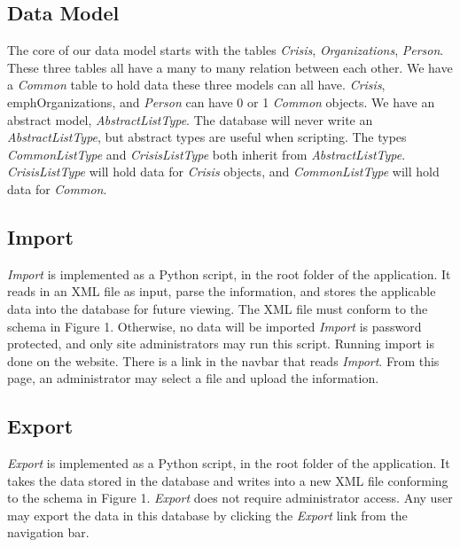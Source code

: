 \documentclass[12pt]{report}
\begin{document}
\subsection*{Data Model}
The core of our data model starts with the tables \emph{Crisis}, \emph{Organizations}, \emph{Person}.
These three tables all have a many to many relation between each other.
We have a \emph{Common} table to hold data these three models can all have.
\emph{Crisis}, emph{Organizations}, and \emph{Person} can have 0 or 1 \emph{Common} objects.
We have an abstract model, \emph{AbstractListType}.
The database will never write an \emph{AbstractListType}, but abstract types are useful when scripting.
The types \emph{CommonListType} and \emph{CrisisListType} both inherit from \emph{AbstractListType}.
\emph{CrisisListType} will hold data for \emph{Crisis} objects, and \emph{CommonListType} will hold data for \emph{Common}.

\subsection*{Import}
\emph{Import} is implemented as a Python script, in the root folder of the application.
It reads in an XML file as input, parse the information, and stores the applicable data into the database for future viewing.
The XML file must conform to the schema in Figure 1.
Otherwise, no data will be imported
\emph{Import} is password protected, and only site administrators may run this script.
Running import is done on the website.
There is a link in the navbar that reads \emph{Import}.
From this page, an administrator may select a file and upload the information.

\subsection*{Export}
\emph{Export} is implemented as a Python script, in the root folder of the application.
It takes the data stored in the database and writes into a new XML file conforming to the schema in Figure 1.
\emph{Export} does not require administrator access.
Any user may export the data in this database by clicking the \emph{Export} link from the navigation bar.
\end{document}
